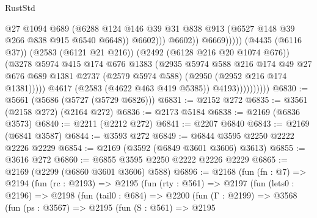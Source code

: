 \begin{lexlean}{RustStd}
\begin{coremodule}
{\begin{coremodule}
{{{{{{{{{{{{{{{                                              @27
                                              @1094
                                              @689
                                              (@6288
                                                @124
                                                @146
                                                @39
                                                @31
                                                @838
                                                @913
                                                (@6527 @148 @39 @266 @838 @915 @6540 @6648))
                                              @6602)))
                                        @6602))
                                    @6669)))))
                          (@4435 (@6116 @37))
                          (@2583 (@6121 @21 @216))
                          (@2492 (@6128 @216 @20 @1074 @676))
                          (@3278
                            @5974
                            @415
                            @174
                            @676
                            @1383
                            (@2935
                              @5974
                              @588
                              @216
                              @174
                              @49
                              @27
                              @676
                              @689
                              @1381
                              @2737
                              (@2579 @5974 @588)
                              (@2950 (@2952 @216 @174 @1381)))))
                        @4617
                        (@2583 (@4622 @463 @419 @5385))
                        @4193))))))))))
@6830 := @5661 (@5686 (@5727 (@5729 @6826)))
@6831 := @2152 @272
@6835 := @3561 (@2158 @272) (@2164 @272)
@6836 := @2173 @5184
@6838 := @2169 (@6836 @3573)
@6840 := @2211 (@2212 @272)
@6841 := @2207 @6840
@6843 := @2169 (@6841 @3587)
@6844 := @3593 @272
@6849 := @6844 @3595 @2250 @2222 @2226 @2229
@6854 := @2169 (@3592 (@6849 @3601 @3606) @3613)
@6855 := @3616 @272
@6860 := @6855 @3595 @2250 @2222 @2226 @2229
@6865 := @2169 (@2299 (@6860 @3601 @3606) @588)
@6896 := @2168
    (fun (fn : @7) =>
    @2194
      (fun (rc : @2193) =>
      @2195
        (fun (rty : @561) =>
        @2197
          (fun (lets0 : @2196) =>
          @2198
            (fun (tail0 : @684) =>
            @2200
              (fun (Γ : @2199) =>
              @3568
                (fun (ps : @3567) =>
                @2195
                  (fun (S : @561) =>
                  @2195
}}}}}}}}}}}}}}}
\end{coremodule}}
\end{coremodule}
\end{lexlean}
